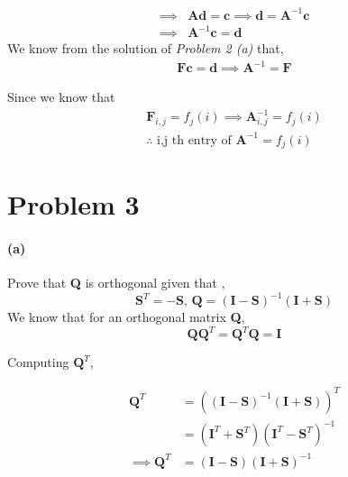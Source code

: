 \documentclass[12pt, letterpaper]{article}
\begin{document}
\[\begin{split}
    \implies &\mathbf{Ad} = \mathbf{c}
    \implies \mathbf{d} = \mathbf{A}^{-1}\mathbf{c}\\
    \implies &\mathbf{A}^{-1}\mathbf{c} = \mathbf{d}
\end{split}\]
We know from the solution of \textit{Problem 2 (a)} that,
\[\begin{split}
    \mathbf{Fc} = \mathbf{d} \implies \mathbf{A}^{-1} = \mathbf{F}
\end{split}\]

Since we know that
\[\begin{split}
  \mathbf{F}_{i,j} = f_j(i)
    \implies \mathbf{A}^{-1}_{i,j} = f_j(i)\\
    \boxed{\therefore \text{ i,j th entry of }\mathbf{A}^{-1} = f_j(i)}
\end{split}\]

\pagebreak
\section*{Problem 3}
\label{sec:prob3}

\paragraph{(a)} Prove that \textbf{Q} is orthogonal given that ,
\begin{equation}\label{3a0}
  \mathbf{S}^T = -\mathbf{S},\,
  \mathbf{Q} = (\mathbf{I} - \mathbf{S})^{-1}(\mathbf{I} + \mathbf{S})
\end{equation}
\newline
We know that for an orthogonal matrix \textbf{Q},
\begin{equation}\label{3a1}
  \mathbf{QQ}^T = \mathbf{Q}^T\mathbf{Q} = \mathbf{I}
\end{equation}

Computing $\mathbf{Q}^T$,

\begin{equation}\label{3a2}
  \begin{split}
    \mathbf{Q}^T &= ((\mathbf{I} - \mathbf{S})^{-1}(\mathbf{I} + \mathbf{S}))^T\\
    &= (\mathbf{I}^T + \mathbf{S}^T)(\mathbf{I}^T - \mathbf{S}^T)^{-1}\\
    \implies \mathbf{Q}^T&= (\mathbf{I} - \mathbf{S})(\mathbf{I} + \mathbf{S})^{-1}\\
  \end{split}
\end{equation}
\end{document}
